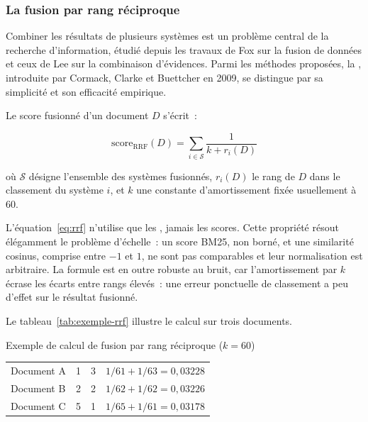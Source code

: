 \subsubsection{La fusion par rang réciproque}

Combiner les résultats de plusieurs systèmes est un problème central de la
recherche d'information, étudié depuis les travaux de Fox sur la fusion de
données et ceux de Lee sur la combinaison d'évidences. Parmi les méthodes
proposées, la , introduite par Cormack,
Clarke et Buettcher en 2009, se distingue par sa simplicité et son efficacité
empirique.

Le score fusionné d'un document $D$ s'écrit~:

\begin{equation}
  \mathrm{score}_{\mathrm{RRF}}(D) =
  \sum_{i \in \mathcal{S}} \frac{1}{k + r_i(D)}
  \label{eq:rrf}
\end{equation}

où $\mathcal{S}$ désigne l'ensemble des systèmes fusionnés, $r_i(D)$ le rang de
$D$ dans le classement du système $i$, et $k$ une constante d'amortissement
fixée usuellement à $60$.

\begin{btpbox}
L'équation~\eqref{eq:rrf} n'utilise que les , jamais les scores.
Cette propriété résout élégamment le problème d'échelle~: un score BM25, non
borné, et une similarité cosinus, comprise entre $-1$ et $1$, ne sont pas
comparables et leur normalisation est arbitraire. La formule est en outre
robuste au bruit, car l'amortissement par $k$ écrase les écarts entre rangs
élevés~: une erreur ponctuelle de classement a peu d'effet sur le résultat
fusionné.
\end{btpbox}

Le tableau~\ref{tab:exemple-rrf} illustre le calcul sur trois documents.

\begin{btptable}{Exemple de calcul de fusion par rang réciproque ($k = 60$)}
\label{tab:exemple-rrf}
\begin{tabularx}{\linewidth}{@{}L{2.2cm} C{2.2cm} C{2.6cm} Y@{}}
\toprule
{}
 &  &  &  \\
\midrule
Document A & 1 & 3 & $1/61 + 1/63 = 0{,}03228$ \\
Document B & 2 & 2 & $1/62 + 1/62 = 0{,}03226$ \\
Document C & 5 & 1 & $1/65 + 1/61 = 0{,}03178$ \\
\bottomrule
\end{tabularx}
\end{btptable}

